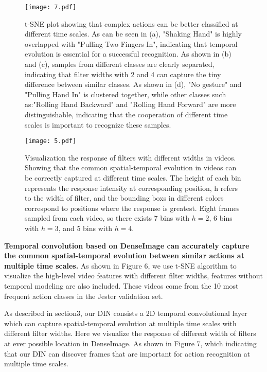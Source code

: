 \documentclass{article}
\begin{document}
\begin{figure*}[!htbp]
	\begin{center}
		\texttt{[image: 7.pdf]}
		\caption{t-SNE plot showing that complex actions can be better classified at different time scales. As can be seen in (a), "Shaking Hand" is highly overlapped with "Pulling Two Fingers In", indicating that temporal evolution is essential for a successful recognition. As shown in (b) and (c), samples from different classes are clearly separated, indicating that filter widths with 2 and 4 can capture the tiny difference between similar classes. As shown in (d), "No gesture" and "Pulling Hand In" is clustered together, while other classes such as:"Rolling Hand Backward" and "Rolling Hand Forward" are more distinguishable, indicating that the cooperation  of different time scales is important to recognize these samples.}
		\label{Figure 6.}
	\end{center}
	\vspace{-0.5em}
\end{figure*}
\begin{figure*}[h]
	\begin{center}
		\texttt{[image: 5.pdf]}
		\caption{Visualization the response of filters with different widths in videos. Showing that the common spatial-temporal evolution in videos can be correctly captured at different time scales. The height of each bin represents the response intensity at corresponding position, h refers to the width of filter, and the bounding boxs in different colors correspond to positions where the response is greatest. Eight frames sampled from each video, so there exists 7 bins with $h=2$, 6 bins with $h=3$, and 5 bins with $h=4$.}
		\label{Figure 7.}
	\end{center}
	\vspace{-0.5em}
\end{figure*}

\textbf{Temporal convolution based on DenseImage can accurately capture the common spatial-temporal evolution between similar actions at multiple time scales.} As shown in Figure 6, we use t-SNE algorithm to visualize the high-level video features with different filter widths, features without temporal modeling are  also included. These videos come from the 10 most frequent action classes in the Jester validation set.

As described in section3, our DIN consists a 2D temporal convolutional layer which can capture spatial-temporal evolution at multiple time scales with different filter widths. Here we visualize the response of different width of filters at ever possible location in DenseImage. As shown in Figure 7, which indicating that our DIN can discover frames that are important for action recognition at multiple time scales.
\end{document}
